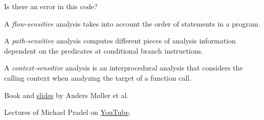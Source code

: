 \documentclass{article}
\begin{document}
Is there an error in this code?

\plush{}



A \emph{flow-sensitive} analysis takes into account the order of statements in a program.

\plush{}


A \emph{path-sensitive} analysis computes different pieces of analysis information dependent on the predicates at conditional branch instructions.

\plush{}


A \emph{context-sensitive} analysis is an interprocedural analysis that considers the calling context when analyzing the target of a function call.

\plush{}


Book and \href{http://cs.au.dk/~amoeller/spa/}{slides} by Anders M\o{}ller et al.

Lectures of Michael Pradel on \href{https://www.youtube.com/watch?v=rJYgTJaXZU0}{YouTube}.
\end{document}
